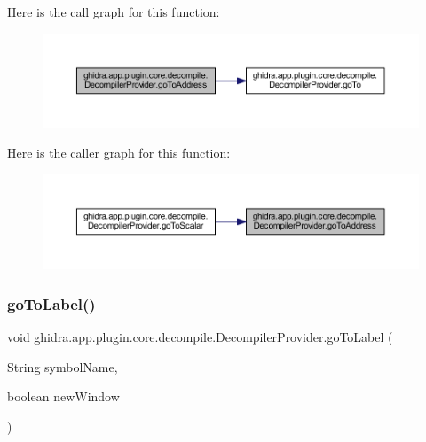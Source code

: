Here is the call graph for this function\+:
\nopagebreak
\begin{figure}[H]
\begin{center}
\leavevmode
\includegraphics[width=350pt]{classghidra_1_1app_1_1plugin_1_1core_1_1decompile_1_1_decompiler_provider_af9cbc00f79147db02fcb654511044e78_cgraph}
\end{center}
\end{figure}
Here is the caller graph for this function\+:
\nopagebreak
\begin{figure}[H]
\begin{center}
\leavevmode
\includegraphics[width=350pt]{classghidra_1_1app_1_1plugin_1_1core_1_1decompile_1_1_decompiler_provider_af9cbc00f79147db02fcb654511044e78_icgraph}
\end{center}
\end{figure}
\mbox{\label{classghidra_1_1app_1_1plugin_1_1core_1_1decompile_1_1_decompiler_provider_a3012a2929e8b6f83e89da04ee89431d0}} 
\subsubsection{\texorpdfstring{goToLabel()}{goToLabel()}}
{\footnotesize\ttfamily void ghidra.\+app.\+plugin.\+core.\+decompile.\+Decompiler\+Provider.\+go\+To\+Label (\begin{DoxyParamCaption}\item[{String}]{symbol\+Name,  }\item[{boolean}]{new\+Window }\end{DoxyParamCaption})\hspace{0.3cm}{\ttfamily [inline]}}



